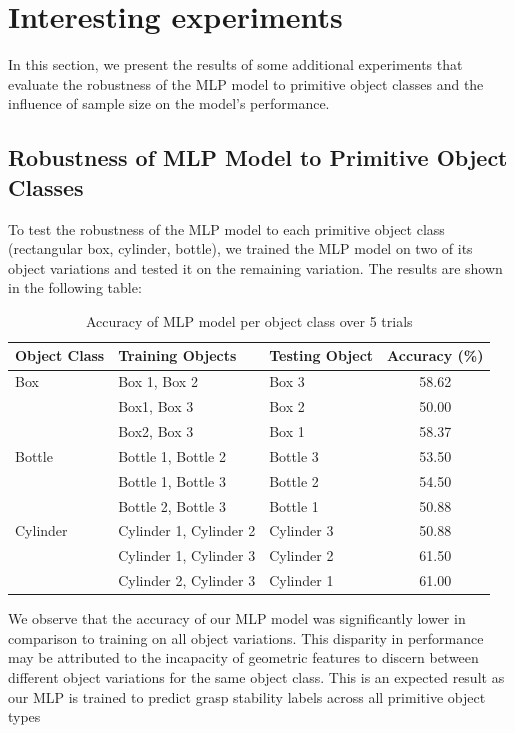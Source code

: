\documentclass[11pt, a4paper]{report}
\begin{document}
\newpage
\section{Interesting experiments}\label{sec:5.4}
In this section, we present the results of some additional experiments that evaluate the robustness of the MLP model to primitive object classes and the influence of sample size on the model's performance.


\subsection{Robustness of MLP Model to Primitive Object Classes}\label{sec:5.4.1}
To test the robustness of the MLP model to each primitive object class (rectangular box, cylinder, bottle), we trained the MLP model on two of its object variations and tested it on the remaining variation. The results are shown in the following table:
\begin{table}[H]
    \centering
    \begin{tabular}{lllc}
        \toprule
        Object Class & Training Objects & Testing Object & Accuracy (\%) \\
        \midrule
        Box & Box 1, Box 2 & Box 3 & 58.62 \\
        & Box1, Box 3 & Box 2 & 50.00 \\
        & Box2, Box 3 & Box 1 & 58.37 \\
        Bottle & Bottle 1, Bottle 2 & Bottle 3 & 53.50 \\
        & Bottle 1, Bottle 3 & Bottle 2 & 54.50 \\
        & Bottle 2, Bottle 3 & Bottle 1 & 50.88 \\
        Cylinder & Cylinder 1, Cylinder 2 & Cylinder 3 & 50.88 \\
        & Cylinder 1, Cylinder 3 & Cylinder 2 & 61.50 \\
        & Cylinder 2, Cylinder 3 & Cylinder 1 & 61.00 \\
        \bottomrule
    \end{tabular}
    \caption{Accuracy of MLP model per object class over 5 trials}
    \label{tab:5.3}
\end{table}
We observe that the accuracy of our MLP model was significantly lower in comparison to training on all object variations. This disparity in performance may be attributed to the incapacity of geometric features to discern between different object variations for the same object class. This is an expected result as our MLP is trained to predict grasp stability labels across all primitive object types 
\end{document}

